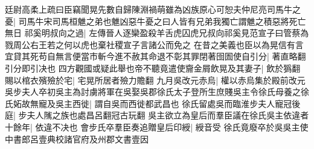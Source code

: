 廷尉高柔上疏曰臣竊聞晃先數自歸陳淵禍萌雖為凶族原心可恕夫仲尼亮司馬牛之憂|{
	司馬牛宋司馬桓魋之弟也魋凶惡牛憂之曰人皆有兄弟我獨亡謂魋之積惡將死亡無日}
祁奚明叔向之過|{
	左傳晉人逐欒盈殺羊舌虎囚虎兄叔向祁奚見范宣子曰管蔡為戮周公右王若之何以虎也棄社稷宣子言諸公而免之}
在昔之美義也臣以為晃信有言宜貸其死苟自無言便當市斬今進不赦其命退不彰其罪閉著囹圄使自引分|{
	著直略翻引分即引决也}
四方觀國或疑此舉也帝不聽竟遣使齎金屑飲晃及其妻子|{
	飲於㺔翻}
賜以棺衣殯殮於宅|{
	宅晃所居者殮力贍翻}
九月吳改元赤烏|{
	權以赤烏集於殿前改元}
吳步夫人卒初吳主為討虜將軍在吳娶吳郡徐氏太子登所生庶賤吳主令徐氏母養之徐氏妬故無寵及吳主西徙|{
	謂自吳而西徙都武昌也}
徐氏留處吳而臨淮步夫人寵冠後庭|{
	步夫人隲之族也處昌呂翻冠古玩翻}
吳主欲立為皇后而羣臣議在徐氏吳主依違者十餘年|{
	依違不决也}
會步氏卒羣臣奏追贈皇后印綬|{
	綬音受}
徐氏竟廢卒於吳吳主使中書郎呂壹典校諸官府及州郡文書壹因

